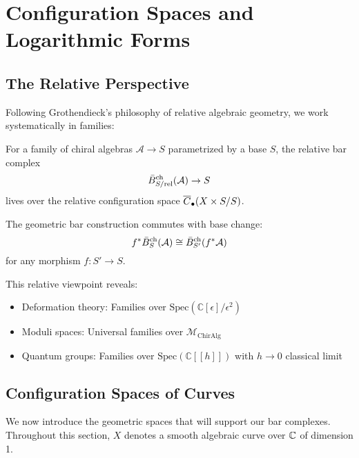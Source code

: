 \section{Configuration Spaces and Logarithmic Forms}
 
\subsection{The Relative Perspective}

Following Grothendieck's philosophy of relative algebraic geometry, we work systematically in families:

\begin{definition}
For a family of chiral algebras $\mathcal{A} \to S$ parametrized by a base $S$, the relative bar complex
\[
\bar{B}^{\text{ch}}_{S/\text{rel}}(\mathcal{A}) \to S
\]
lives over the relative configuration space $\overline{C}_{\bullet}(X \times S/S)$.
\end{definition}

\begin{theorem}
The geometric bar construction commutes with base change:
\[
f^*\bar{B}^{\text{ch}}_S(\mathcal{A}) \cong \bar{B}^{\text{ch}}_{S'}(f^*\mathcal{A})
\]
for any morphism $f: S' \to S$.
\end{theorem}

This relative viewpoint reveals:
\begin{itemize}
\item Deformation theory: Families over $\text{Spec}(\mathbb{C}[\epsilon]/\epsilon^2)$
\item Moduli spaces: Universal families over $\mathcal{M}_{\text{ChirAlg}}$
\item Quantum groups: Families over $\text{Spec}(\mathbb{C}[[h]])$ with $h \to 0$ classical limit
\end{itemize}

\subsection{Configuration Spaces of Curves}
 
We now introduce the geometric spaces that will support our bar complexes. Throughout this section, $X$ denotes a smooth algebraic curve over $\mathbb{C}$ of dimension 1.
 
